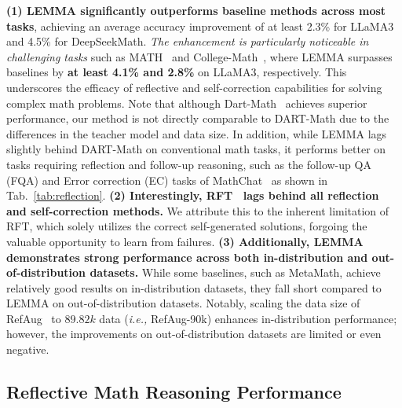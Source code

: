 \documentclass[11pt]{article}
\begin{document}
\noindent \textbf{(1) LEMMA significantly outperforms baseline methods across most tasks}, achieving an average accuracy improvement of at least 2.3\% for LLaMA3 and 4.5\% for DeepSeekMath. \textit{The enhancement is particularly noticeable in challenging tasks} such as MATH~\cite{hendrycksmath2021} and College-Math~\cite{tangmathscale}, where LEMMA surpasses baselines by \textbf{at least 4.1\% and 2.8\%} on LLaMA3, respectively. This underscores the efficacy of reflective and self-correction capabilities for solving complex math problems. Note that although Dart-Math~\cite{tong2024dartmath} achieves superior performance, our method is not directly comparable to DART-Math due to the differences in the teacher model and data size. In addition, while LEMMA lags slightly behind DART-Math on conventional math tasks, it performs better on tasks requiring reflection and follow-up reasoning, such as the follow-up QA (FQA) and Error correction (EC) tasks of MathChat~\cite{liang2024mathchat} as shown in Tab.~\ref{tab:reflection}.
\textbf{(2) Interestingly, RFT~\cite{yuan2023scaling} lags behind all reflection and self-correction methods.} We attribute this to the inherent limitation of RFT, which solely utilizes the correct self-generated solutions, forgoing the valuable opportunity to learn from failures. 
\textbf{(3) Additionally, LEMMA demonstrates strong performance across both in-distribution and out-of-distribution datasets.} While some baselines, such as MetaMath, achieve relatively good results on in-distribution datasets, they fall short compared to LEMMA on out-of-distribution datasets. Notably, scaling the data size of RefAug~\cite{zhang-etal-2024-learn} to $89.82k$ data (\textit{i.e.,} RefAug-90k) enhances in-distribution performance; however, the improvements on out-of-distribution datasets are limited or even negative. 

\subsection{Reflective Math Reasoning Performance}

\end{document}
